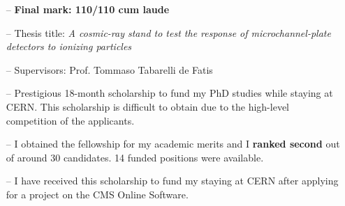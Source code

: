 \documentclass[10pt,a4paper]{altacv}
\begin{document}
\begin{itemize}
    \setlength{\itemindent}{0.5em}
    \item[--]   \textbf{Final mark: 110/110 cum laude}
    \item[--]   Thesis title: \textit{A cosmic-ray stand to test the response of microchannel-plate detectors to ionizing particles}
    \item[--]   Supervisors: Prof. Tommaso Tabarelli de Fatis
\end{itemize}



\begin{itemize}
    \setlength{\itemindent}{0.5em}
    \item[--]   Prestigious 18-month scholarship to fund my PhD studies while staying at CERN. 
    This scholarship is difficult to obtain due to the high-level competition of the applicants.
\end{itemize}

\medskip


\begin{itemize}
    \setlength{\itemindent}{0.5em}
    \item[--]   I obtained the fellowship for my academic merits and I \textbf{ranked second} out of around 30 candidates. 14 funded positions were available.
\end{itemize}

\medskip


\begin{itemize}
    \setlength{\itemindent}{0.5em}
    \item[--]   I have received this scholarship to fund my staying at CERN after applying for a project on the CMS Online Software.
\end{itemize}

\newpage


\end{document}
